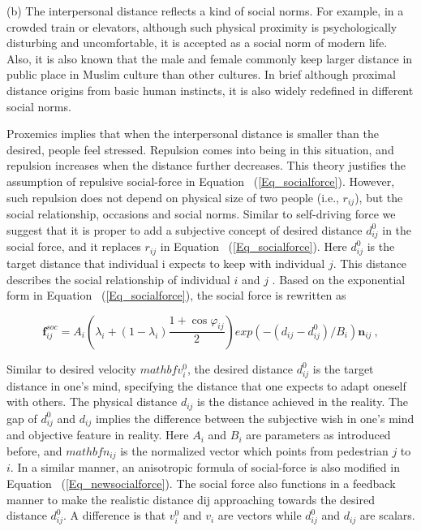 \documentclass{article}
\begin{document}
\noindent (b) The interpersonal distance reflects a kind of social norms.  For example, in a crowded train or elevators, although such physical proximity is psychologically disturbing and uncomfortable, it is accepted as a social norm of modern life.  Also, it is also known that the male and female commonly keep larger distance in public place in Muslim culture than other cultures.  In brief although proximal distance origins from basic human instincts, it is also widely redefined in different social norms.


Proxemics implies that when the interpersonal distance is smaller than the desired, people feel stressed.  Repulsion comes into being in this situation, and repulsion increases when the distance further decreases.  This theory justifies the assumption of repulsive social-force in Equation ~(\ref{Eq_socialforce}).  However, such repulsion does not depend on physical size of two people (i.e., $r_{ij}$), but the social relationship, occasions and social norms.  Similar to self-driving force we suggest that it is proper to add a subjective concept of desired distance $d_{ij}^0$ in the social force, and it replaces $r_{ij}$ in Equation ~(\ref{Eq_socialforce}).  Here $d_{ij}^0$ is the target distance that individual i expects to keep with individual $j$.  This distance describes the social relationship of individual $i$ and $j$ .  Based on the exponential form in Equation ~(\ref{Eq_socialforce}), the social force is rewritten as

%
\begin{equation}\label{Eq_newsocialforce}
 \mathbf{f}_{ij}^{soc} = A_i \left ( \lambda_i + (1-\lambda_i) \frac{1 + \cos \varphi_{ij}}{2} \right ) exp \left( -(d_{ij}-d_{ij}^0)/B_i \right) \mathbf{n}_{ij} ~,
\end{equation}
%

Similar to desired velocity $mathbf{v}_i^0$, the desired distance $d_{ij}^0$ is the target distance in one's mind, specifying the distance that one expects to adapt oneself with others.  The physical distance $d_{ij}$ is the distance achieved in the reality. The gap of $d_{ij}^0$ and $d_{ij}$ implies the difference between the subjective wish in one's mind and objective feature in reality. Here $A_i$ and $B_i$ are parameters as introduced before, and $mathbf{n}_{ij}$ is the normalized vector which points from pedestrian $j$ to $i$. In a similar manner, an anisotropic formula of social-force is also modified in Equation ~(\ref{Eq_newsocialforce}). The social force also functions in a feedback manner to make the realistic distance dij approaching towards the desired distance $d_{ij}^0$. A difference is that $v_i^0$ and $v_i$ are vectors while $d_{ij}^0$ and $d_{ij}$ are scalars.
\end{document}
